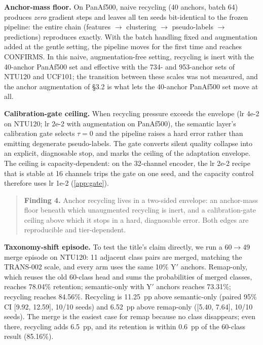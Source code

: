 \documentclass[preprint,12pt,number]{elsarticle}
\begin{document}
\textbf{Anchor-mass floor.} On PanAf500, naive recycling (40 anchors, batch 64)
produces \emph{zero} gradient steps and leaves all ten seeds bit-identical to the
frozen pipeline: the entire chain (features $\rightarrow$ clustering $\rightarrow$ pseudo-labels $\rightarrow$
predictions) reproduces exactly. With the batch handling fixed and
augmentation added at the gentle setting, the pipeline moves for the first
time and reaches CONFIRMS. In this naive, augmentation-free setting,
recycling is inert with the 40-anchor PanAf500 set and effective with the
734- and 953-anchor sets of NTU120 and UCF101; the transition between these
scales was not measured, and the anchor augmentation of \S3.2 is what lets
the 40-anchor PanAf500 set move at all.

\textbf{Calibration-gate ceiling.} When recycling pressure exceeds the envelope
(lr 4e-2 on NTU120; lr 2e-2 with augmentation on PanAf500), the semantic
layer's calibration gate selects $\tau = 0$ and the
pipeline raises a hard error rather than emitting degenerate pseudo-labels.
The gate converts silent quality collapse into an explicit, diagnosable
stop, and marks the ceiling of the adaptation envelope. The ceiling is
capacity-dependent: on the 32-channel encoder, the lr 2e-2 recipe that is
stable at 16 channels trips the gate on one seed, and the capacity control
therefore uses lr 1e-2 (\ref{app:gate}).

\begin{quote}
\textbf{Finding 4.} Anchor recycling lives in a two-sided envelope: an
anchor-mass floor beneath which unaugmented recycling is inert, and a
calibration-gate ceiling above which it stops in a hard, diagnosable error.
Both edges are reproducible and tier-dependent.
\end{quote}

\textbf{Taxonomy-shift episode.} To test the title's claim directly, we run a
60$\rightarrow$49 merge episode on NTU120: 11 adjacent class pairs are merged,
matching the TRANS-002 scale, and every arm uses the same 10\% Y$'$ anchors.
Remap-only, which reuses the old 60-class head and sums the probabilities of
merged classes, reaches 78.04\% retention; semantic-only with Y$'$ anchors
reaches 73.31\%; recycling reaches 84.56\%. Recycling is 11.25~pp above
semantic-only (paired 95\% CI [9.92, 12.59], 10/10 seeds) and 6.52~pp above
remap-only ([5.40, 7.64], 10/10 seeds). The merge is the easiest case for
remap because no class disappears; even there, recycling adds 6.5~pp, and its
retention is within 0.6~pp of the 60-class result (85.16\%).
\end{document}
